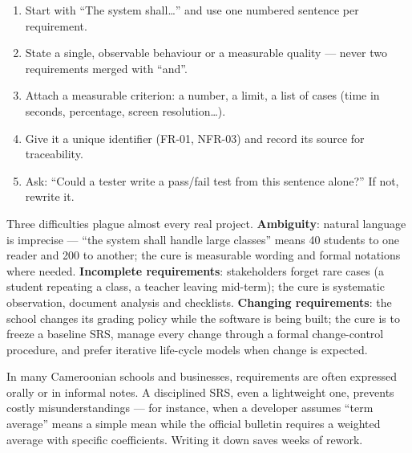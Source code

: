 \documentclass[11pt]{article}
\newcounter{popsec}
\newcounter{popsub}
\newcommand{\courssub}[1]{%
  \stepcounter{popsub}%
  \par\vspace{9pt}\noindent{\popxbold\fontsize{11.5}{13}\selectfont\color{popink}{\color{poporange}\thepopsec.\thepopsub}\hspace{6pt}#1}\par\nopagebreak\vspace{4pt}
}
\begin{document}
\begin{methode}
\begin{enumerate}
\item Start with ``The system shall\ldots'' and use one numbered sentence per requirement.
\item State a single, observable behaviour or a measurable quality --- never two requirements merged with ``and''.
\item Attach a measurable criterion: a number, a limit, a list of cases (time in seconds, percentage, screen resolution\ldots).
\item Give it a unique identifier (FR-01, NFR-03) and record its source for traceability.
\item Ask: ``Could a tester write a pass/fail test from this sentence alone?'' If not, rewrite it.
\end{enumerate}
\end{methode}

\courssub{Common Problems in Practice}

Three difficulties plague almost every real project. \textbf{Ambiguity}: natural language is imprecise --- ``the system shall handle large classes'' means 40 students to one reader and 200 to another; the cure is measurable wording and formal notations where needed. \textbf{Incomplete requirements}: stakeholders forget rare cases (a student repeating a class, a teacher leaving mid-term); the cure is systematic observation, document analysis and checklists. \textbf{Changing requirements}: the school changes its grading policy while the software is being built; the cure is to freeze a baseline SRS, manage every change through a formal change-control procedure, and prefer iterative life-cycle models when change is expected.

\begin{savaistu}
In many Cameroonian schools and businesses, requirements are often expressed orally or in informal notes. A disciplined SRS, even a lightweight one, prevents costly misunderstandings --- for instance, when a developer assumes ``term average'' means a simple mean while the official bulletin requires a weighted average with specific coefficients. Writing it down saves weeks of rework.
\end{savaistu}
\end{document}
